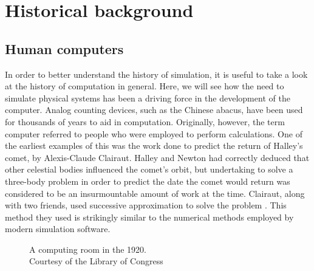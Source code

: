 \documentclass[\rootfolder/main.tex]{subfiles}
\begin{document}
\chapter{Historical background} %

\label{Chapter01} %

\section{Human computers}


In order to better understand the history of simulation, it is useful to take a look at the history of computation in general.
Here, we will see how the need to simulate physical systems has been a driving force in the development of the computer.
Analog counting devices, such as the Chinese abacus, have been used for thousands of years to aid in computation.
Originally, however, the term computer referred to people who were employed to perform calculations.
One of the earliest examples of this was the work done to predict the return of Halley's comet, by Alexis-Claude Clairaut.
Halley and Newton had correctly deduced that other celestial bodies influenced the comet's orbit, but undertaking to solve a three-body problem in order to predict the date the comet would return was considered to be an insurmountable amount of work at the time.
Clairaut, along with two friends, used successive approximation to solve the problem \cite{wilson1993}.
This method they used is strikingly similar to the numerical methods employed by modern simulation software.


\begin{wrapfigure}{R}{0.6\columnwidth}
    \caption[A computing room in the 1920s]
            {A computing room in the 1920. \\ Courtesy of the Library of Congress \label{fig:tabulatingroom}}
\end{wrapfigure}
\end{document}
